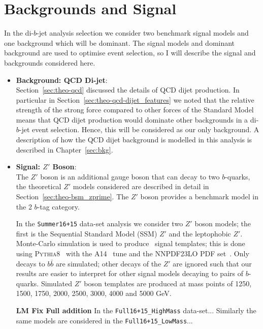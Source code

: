 \section{Backgrounds and Signal}
\label{sec:evt-s+b}

In the di-$b$-jet analysis selection we consider two
benchmark signal models and one background which will be dominant.
The signal models and dominant background are
used to optimise event selection, so I will describe
the signal and backgrounds considered here.

\begin{itemize}[leftmargin=*]
\item\textbf{Background: QCD Di-jet}: \\
  Section~\ref{sec:theo-qcd} discussed the details of QCD dijet production.
  In particular in Section~\ref{sec:theo-qcd-dijet_features} we noted that the
  relative strength of the strong force compared to other forces
  of the Standard Model means that
  QCD dijet production would dominate other backgrounds in a di-$b$-jet event selection.
  Hence, this will be considered as our only background.
  A description of how the QCD dijet background is modelled in this analysis is described in Chapter~\ref{sec:bkg}.\\

\item\textbf{Signal: $Z'$ Boson}: \\
  The $Z'$ boson is an additional gauge boson that can decay to two $b$-quarks,
  the theoretical $Z'$ models considered are
  described in detail in Section~\ref{sec:theo-bsm_zprime}.
  The $Z'$ boson provides a benchmark model in the 2 $b$-tag category.

  In the \verb|Summer16+15| data-set analysis we consider two $Z'$ boson models;
  the first is the Sequential Standard Model (SSM) $Z'$ and the leptophobic $Z'$.
  Monte-Carlo simulation is used to produce \mjj~signal templates;
  this is done using \textsc{Pythia8}~\cite{dibjet-pythia8} with the A14~\cite{dibjet-a14} tune and the NNPDF23LO PDF set~\cite{dibjet-nnpdf}.
  Only decays to $b\bar{b}$ are simulated;
  other decays of the  $Z'$  are ignored such that our
  results are easier to interpret for other signal models decaying to pairs of $b$-quarks.
  Simulated $Z'$ boson templates are produced at mass points of
  1250, 1500, 1750, 2000, 2500, 3000, 4000 and 5000 GeV.
  
  \textbf{LM Fix Full addition}
  In the \verb|Full16+15_HighMass| data-set...
  Similarly the same models are considered in the \verb|Full16+15_LowMass|... \\


\end{itemize}
